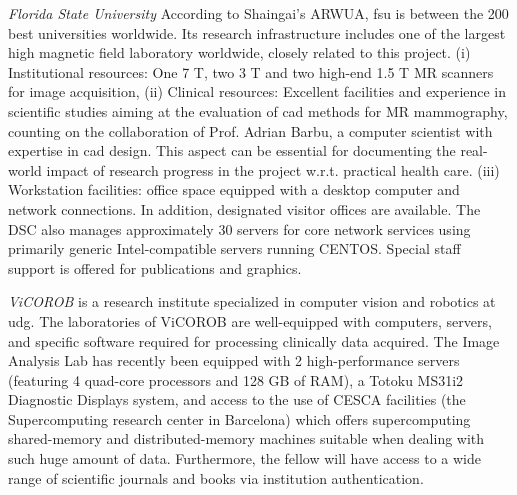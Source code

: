 \emph{Florida State University} 
According to Shaingai's ARWUA, \ac{fsu} is between the 200 best universities worldwide. 
Its research infrastructure includes one of the largest high magnetic field laboratory worldwide, closely related to this project. 
(i) Institutional resources: One 7 T, two 3 T and two high-end 1.5 T MR scanners for image acquisition,
(ii) Clinical resources: Excellent facilities and experience in scientific studies aiming at the evaluation of \ac{cad} methods for MR mammography, counting on the collaboration of Prof. Adrian Barbu, a computer scientist with expertise in \ac{cad} design. 
This aspect can be essential for documenting the real-world impact of research progress in the project w.r.t. practical health care. 
(iii) Workstation facilities: office space equipped with a desktop computer and network connections. 
In addition, designated visitor offices are available. 
The DSC also manages approximately 30 servers for core network services using primarily generic Intel-compatible servers running CENTOS. 
Special staff support is offered for publications and graphics.

\emph{ViCOROB} is a research institute specialized in computer vision and robotics at \ac{udg}.
The laboratories of ViCOROB are well-equipped with computers, servers, and specific software required for processing clinically data acquired. 
The Image Analysis Lab has recently been equipped with 2 high-performance servers (featuring 4 quad-core processors and 128 GB of RAM), a Totoku MS31i2 Diagnostic Displays system, and access to the use of CESCA facilities (the Supercomputing research center in Barcelona) which offers supercomputing shared-memory and distributed-memory machines suitable when dealing with such huge amount of data.
Furthermore, the fellow will have access to a wide range of scientific journals and books via institution authentication.


